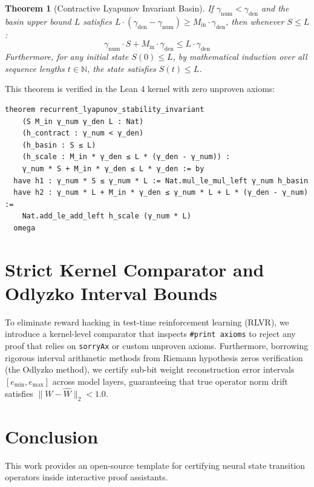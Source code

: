 \documentclass[11pt,a4paper]{article}
\newtheorem{theorem}{Theorem}
\theoremstyle{definition}
\begin{document}
\begin{theorem}[Contractive Lyapunov Invariant Basin]
If $\gamma_{\text{num}} < \gamma_{\text{den}}$ and the basin upper bound $L$ satisfies $L \cdot (\gamma_{\text{den}} - \gamma_{\text{num}}) \ge M_{\text{in}} \cdot \gamma_{\text{den}}$, then whenever $S \le L$:
\begin{equation}
\gamma_{\text{num}} \cdot S + M_{\text{in}} \cdot \gamma_{\text{den}} \le L \cdot \gamma_{\text{den}}
\end{equation}
Furthermore, for any initial state $S(0) \le L$, by mathematical induction over all sequence lengths $t \in \mathbb{N}$, the state satisfies $S(t) \le L$.
\end{theorem}
This theorem is verified in the Lean 4 kernel with zero unproven axioms:
\begin{verbatim}
theorem recurrent_lyapunov_stability_invariant
    (S M_in γ_num γ_den L : Nat)
    (h_contract : γ_num < γ_den)
    (h_basin : S ≤ L)
    (h_scale : M_in * γ_den ≤ L * (γ_den - γ_num)) :
    γ_num * S + M_in * γ_den ≤ L * γ_den := by
  have h1 : γ_num * S ≤ γ_num * L := Nat.mul_le_mul_left γ_num h_basin
  have h2 : γ_num * L + M_in * γ_den ≤ γ_num * L + L * (γ_den - γ_num) :=
    Nat.add_le_add_left h_scale (γ_num * L)
  omega
\end{verbatim}

\section{Strict Kernel Comparator and Odlyzko Interval Bounds}
To eliminate reward hacking in test-time reinforcement learning (RLVR), we introduce a kernel-level comparator that inspects \texttt{\#print axioms} to reject any proof that relies on \texttt{sorryAx} or custom unproven axioms. Furthermore, borrowing rigorous interval arithmetic methods from Riemann hypothesis zeros verification (the Odlyzko method), we certify sub-bit weight reconstruction error intervals $[e_{\min}, e_{\max}]$ across model layers, guaranteeing that true operator norm drift satisfies $\|W - \hat{W}\|_2 < 1.0$.

\section{Conclusion}
This work provides an open-source template for certifying neural state transition operators inside interactive proof assistants.
\end{document}
